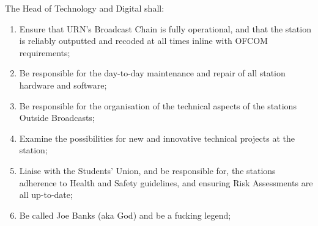 \item The Head of Technology and Digital shall:
\begin{enumerate}[label*=\arabic*.]
    \item Ensure that URN's Broadcast Chain is fully operational, and that the station is reliably outputted and recoded at all times inline with OFCOM requirements;
    \item Be responsible for the day-to-day maintenance and repair of all station hardware and software;
    \item Be responsible for the organisation of the technical aspects of the stations Outside Broadcasts;
    \item Examine the possibilities for new and innovative technical projects at the station;
    \item Liaise with the Students' Union, and be responsible for, the stations adherence to Health and Safety guidelines, and ensuring Risk Assessments are all up-to-date;
    \item Be called Joe Banks (aka God) and be a fucking legend;
\end{enumerate}
